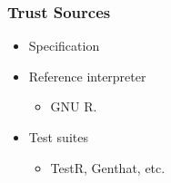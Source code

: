 \documentclass{beamer}
\begin{document}
\begin{frame}
    \frametitle{\R{} Trust Sources}


    \begin{itemize}
        \item Specification \hfill \xmark
        \item Reference interpreter \hfill \cmark
           \begin{itemize}
               \item GNU R.
           \end{itemize}
        \item Test suites \hfill \cmark
           \begin{itemize}
               \item TestR, Genthat, etc.
           \end{itemize}
    \end{itemize}

\end{frame}
\end{document}
